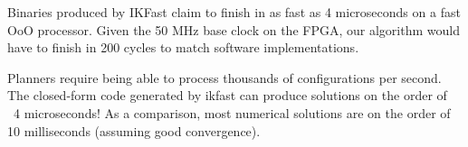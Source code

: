 Binaries produced by IKFast claim to finish in as fast as 4 microseconds on a fast OoO processor. Given the 50 MHz base clock on the FPGA, our algorithm would have to finish in 200 cycles to match software implementations.

Planners require being able to process thousands of configurations per second. The closed-form code generated by ikfast can produce solutions on the order of ~4 microseconds! As a comparison, most numerical solutions are on the order of 10 milliseconds (assuming good convergence).